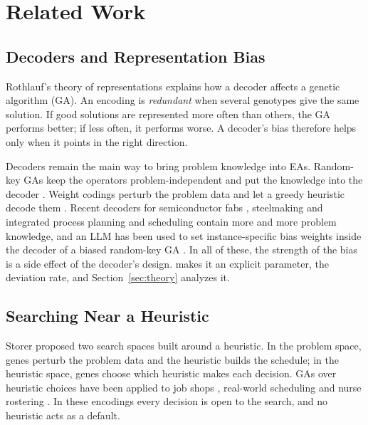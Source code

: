 \section{Related Work}
\label{sec:related}


\subsection{Decoders and Representation Bias}
\label{sec:related:repr}

Rothlauf's theory of representations \cite{rothlauf2006representations} explains how a decoder affects a genetic algorithm (GA).
An encoding is \emph{redundant} when several genotypes give the same solution.
If good solutions are represented more often than others, the GA performs better; if less often, it performs worse.
A decoder's bias therefore helps only when it points in the right direction.

Decoders remain the main way to bring problem knowledge into EAs.
Random-key GAs keep the operators problem-independent and put the knowledge into the decoder \cite{londe2025random}.
Weight codings perturb the problem data and let a greedy heuristic decode them \cite{raidl2000weighted}.
Recent decoders for semiconductor fabs \cite{park2026genetic}, steelmaking \cite{jiang2025soft} and integrated process planning and scheduling \cite{jiang2025more} contain more and more problem knowledge,
and an LLM has been used to set instance-specific bias weights inside the decoder of a biased random-key GA \cite{chacon2025llm}.
In all of these, the strength of the bias is a side effect of the decoder's design.
\RDD makes it an explicit parameter, the deviation rate, and Section~\ref{sec:theory} analyzes it.

\subsection{Searching Near a Heuristic}
\label{sec:related:bias}

Storer \etal \cite{storer1992new} proposed two search spaces built around a heuristic.
In the problem space, genes perturb the problem data and the heuristic builds the schedule; in the heuristic space, genes choose which heuristic makes each decision.
GAs over heuristic choices have been applied to job shops \cite{dorndorf1995evolution}, real-world scheduling \cite{hart1998solving} and nurse rostering \cite{aickelin2004indirect}.
In these encodings every decision is open to the search, and no heuristic acts as a default.

